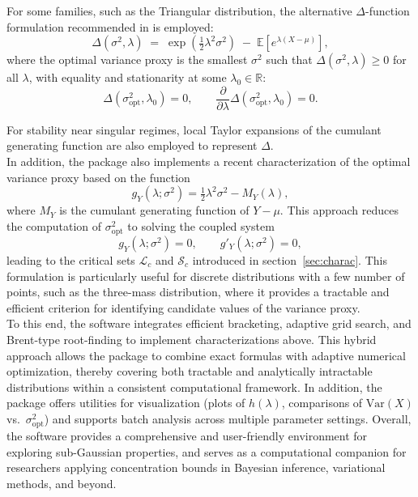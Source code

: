 \documentclass[a4paper, 10pt]{article}
\theoremstyle{definition}
\begin{document}
For some families, such as the Triangular distribution, the alternative $\Delta$-function formulation recommended in \cite{arbel2020strict} is employed: 
\[
\Delta(\sigma^{2}, \lambda) \;=\; \exp\!\left(\tfrac{1}{2}\lambda^{2}\sigma^{2}\right) \;-\; \mathbb{E}\!\left[e^{\lambda(X-\mu)}\right],
\]
where the optimal variance proxy is the smallest $\sigma^{2}$ such that $\Delta(\sigma^{2}, \lambda) \geq 0$ for all $\lambda$, with equality and stationarity at some $\lambda_0 \in \mathbb{R}$:
\[
\Delta(\sigma_{\mathrm{opt}}^{2}, \lambda_0) = 0, 
\qquad 
\frac{\partial}{\partial \lambda}\Delta(\sigma_{\mathrm{opt}}^{2}, \lambda_0) = 0.
\]

For stability near singular regimes, local Taylor expansions of the cumulant generating function are also employed to represent $\Delta$.\\

In addition, the package also implements a recent characterization of the optimal variance proxy based on the function 
\[
g_Y(\lambda;\sigma^2)=\tfrac{1}{2}\lambda^2\sigma^2 - M_Y(\lambda),
\]
where $M_Y$ is the cumulant generating function of $Y-\mu$. 
This approach reduces the computation of $\sigma^2_{\mathrm{opt}}$ to solving the coupled system 
\[
g_Y(\lambda;\sigma^2)=0, \qquad g'_Y(\lambda;\sigma^2)=0,
\]
leading to the critical sets $\mathcal{L}_c$ and $\mathcal{S}_c$ introduced in  section~\ref{sec:charac}. 
This formulation is particularly useful for discrete distributions with a few number of points, such as the three-mass distribution, where it provides a tractable and efficient criterion for identifying candidate values of the variance proxy.\\
To this end, the software integrates efficient bracketing, adaptive grid search, and Brent-type root-finding to implement characterizations above.
This hybrid approach allows the package to combine exact formulas with adaptive numerical optimization, thereby covering both tractable and analytically intractable distributions within a consistent computational framework. 
In addition, the package offers utilities for visualization (plots of $h(\lambda)$, comparisons of $\mathrm{Var}(X)$ vs.\ $\sigma^2_{\text{opt}}$) and supports batch analysis across multiple parameter settings. 
Overall, the software provides a comprehensive and user-friendly environment for exploring sub-Gaussian properties, and serves as a computational companion for researchers applying concentration bounds in Bayesian inference, variational methods, and beyond.
\end{document}

